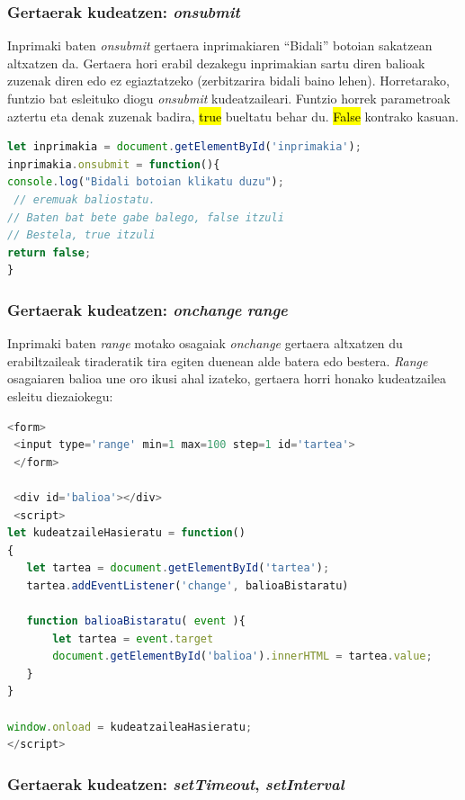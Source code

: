 \subsubsection{Gertaerak kudeatzen: \textit{onsubmit}}
Inprimaki baten \textit{onsubmit} gertaera inprimakiaren ``Bidali'' botoian sakatzean altxatzen da. Gertaera hori erabil dezakegu inprimakian sartu diren balioak zuzenak diren edo ez egiaztatzeko (zerbitzarira bidali baino lehen). Horretarako, funtzio bat esleituko diogu \textit{onsubmit} kudeatzaileari. Funtzio horrek parametroak aztertu eta denak zuzenak badira, \hl{true} bueltatu behar du. \hl{False} kontrako kasuan.

\begin{lstlisting}[language=JavaScript]
let inprimakia = document.getElementById('inprimakia');
inprimakia.onsubmit = function(){
console.log("Bidali botoian klikatu duzu");
 // eremuak baliostatu. 
// Baten bat bete gabe balego, false itzuli
// Bestela, true itzuli
return false;
}
\end{lstlisting}

\subsubsection{Gertaerak kudeatzen: \textit{onchange} \textit{range}}

Inprimaki baten \textit{range} motako osagaiak \textit{onchange} gertaera altxatzen du erabiltzaileak tiraderatik tira egiten duenean alde batera edo bestera. \textit{Range} osagaiaren balioa une oro ikusi ahal izateko, gertaera horri honako kudeatzailea esleitu diezaiokegu:

\begin{lstlisting}[language=JavaScript]
<form>
 <input type='range' min=1 max=100 step=1 id='tartea'>
 </form>

 <div id='balioa'></div>
 <script>
let kudeatzaileHasieratu = function()
{
   let tartea = document.getElementById('tartea');
   tartea.addEventListener('change', balioaBistaratu)

   function balioaBistaratu( event ){
       let tartea = event.target
       document.getElementById('balioa').innerHTML = tartea.value;
   }
} 

window.onload = kudeatzaileaHasieratu;
</script>

\end{lstlisting}

\subsubsection{Gertaerak kudeatzen: \textit{setTimeout}, \textit{setInterval}}

